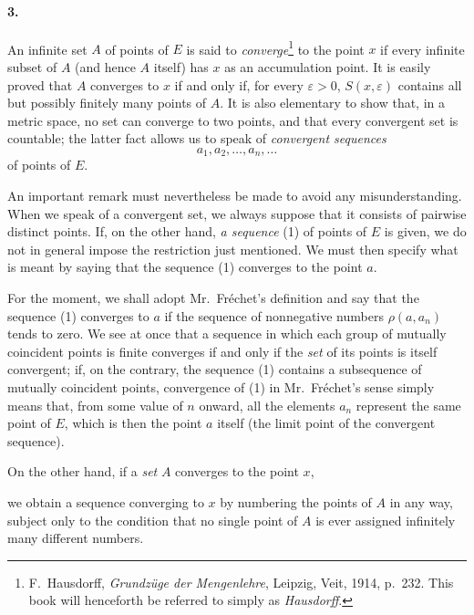 \documentclass[a4paper,12pt]{amsart}
\newcommand{\srcpage}[1]{} %
\begin{document}
\paragraph{3.}
An infinite set $A$ of points of $E$ is said to \textit{converge}\footnote{F.~Hausdorff, \textit{Grundz\"uge der Mengenlehre}, Leipzig, Veit, 1914, p.~232. This book will henceforth be referred to simply as \textit{Hausdorff}.}
to the point $x$ if every infinite subset of $A$ (and hence $A$ itself) has $x$ as an accumulation point. It is easily proved that $A$ converges to $x$ if and only if, for every $\varepsilon>0$, $S(x,\varepsilon)$ contains all but possibly finitely many points of $A$. It is also elementary to show that, in a metric space, no set can converge to two points, and that every convergent set is countable; the latter fact allows us to speak of \textit{convergent sequences}
\begin{equation}\tag{1}\label{u:eq1}
a_1,a_2,\dots,a_n,\dots
\end{equation}
of points of $E$.

An important remark must nevertheless be made to avoid any misunderstanding. When we speak of a convergent set, we always suppose that it consists of pairwise distinct points. If, on the other hand, \textit{a sequence} (1) of points of $E$ is given, we do not in general impose the restriction just mentioned. We must then specify what is meant by saying that the sequence (1) converges to the point $a$.

For the moment, we shall adopt Mr.~Fréchet's definition and say that the sequence (1) converges to $a$ if the sequence of nonnegative numbers $\rho(a,a_n)$ tends to zero. We see at once that a sequence in which each group of mutually coincident points is finite converges if and only if the \textit{set} of its points is itself convergent; if, on the contrary, the sequence (1) contains a subsequence of mutually coincident points, convergence of (1) in Mr.~Fréchet's sense simply means that, from some value of $n$ onward, all the elements $a_n$ represent the same point of $E$, which is then the point $a$ itself (the limit point of the convergent sequence).

On the other hand, if a \textit{set} $A$ converges to the point $x$,
\srcpage{46}
we obtain a sequence converging to $x$ by numbering the points of $A$ in any way, subject only to the condition that no single point of $A$ is ever assigned infinitely many different numbers.
\end{document}
